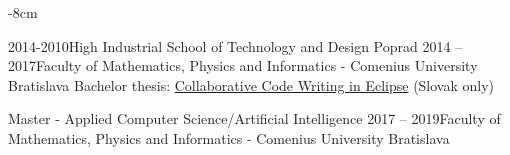 \documentclass[10pt,a4paper]{altacv}
\begin{document}
  \tagline{  }

\begin{adjustwidth}{}{-8cm}
\makecvheader

\end{adjustwidth}
{2014-2010}{High Industrial School of Technology and Design Poprad}
{2014 -- 2017}{Faculty of Mathematics, Physics and Informatics - Comenius University Bratislava}
Bachelor thesis: \href{http://alis.uniba.sk:8088/lib/item?id=chamo:653237&fromLocationLink=false&theme=Katalog}{Collaborative Code Writing in Eclipse} (Slovak only)

\cvevent{} {Master - Applied Computer Science/Artificial Intelligence}
{2017 -- 2019}{Faculty of Mathematics, Physics and Informatics - Comenius University Bratislava}
\end{document}
